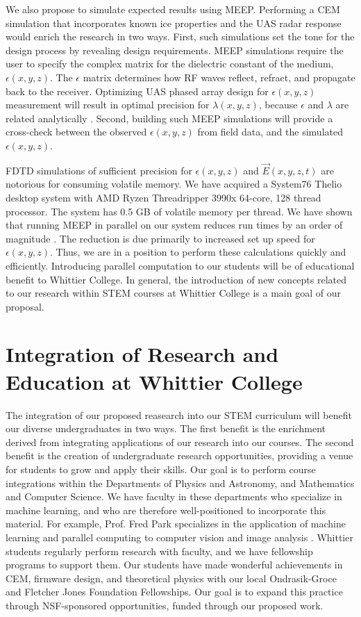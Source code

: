 \documentclass[11pt]{amsart}
\begin{document}
We also propose to simulate expected results using MEEP.  Performing a CEM simulation that incorporates known ice properties and the UAS radar response would enrich the research in two ways.  First, such simulations set the tone for the design process by revealing design requirements.  MEEP simulations require the user to specify the complex matrix for the dielectric constant of the medium, $\epsilon(x,y,z)$.  The $\epsilon$ matrix  determines how RF waves reflect, refract, and propagate back to the receiver.  Optimizing UAS phased array design for $\epsilon(x,y,z)$ measurement will result in optimal precision for $\lambda(x,y,z)$, because $\epsilon$ and $\lambda$ are related analytically \cite{10.3189/2015jog14j214}.  Second, building such MEEP simulations will provide a cross-check between the observed $\epsilon(x,y,z)$ from field data, and the simulated $\epsilon(x,y,z)$. 

FDTD simulations of sufficient precision for $\epsilon(x,y,z)$ and $\vec{E}(x,y,z,t)$ are notorious for consuming volatile memory.  We have acquired a System76 Thelio desktop system with AMD Ryzen Threadripper 3990x 64-core, 128 thread processor.  The system has 0.5 GB of volatile memory per thread.  We have shown that running MEEP in parallel on our system reduces run times by an order of magnitude \cite{meepcon2022}.  The reduction is due primarily to increased set up speed for $\epsilon(x,y,z)$.  Thus, we are in a position to perform these calculations quickly and efficiently.  Introducing parallel computation to our students will be of educational benefit to Whittier College.  In general, the introduction of new concepts related to our research within STEM courses at Whittier College is a main goal of our proposal.

\section{Integration of Research and Education at Whittier College}
\label{sec:int}

The integration of our proposed reasearch into our STEM curriculum will benefit our diverse undergraduates in two ways.  The first benefit is the enrichment derived from integrating applications of our research into our courses.  The second benefit is the creation of undergraduate research opportunities, providing a venue for students to grow and apply their skills.  Our goal is to perform course integrations within the Departments of Physics and Astronomy, and Mathematics and Computer Science.  We have faculty in these departments who specialize in machine learning, and who are therefore well-positioned to incorporate this material.  For example, Prof. Fred Park specializes in the application of machine learning and parallel computing to computer vision and image analysis \cite{SHI201528,doi:10.1137/20M1337041}.  Whittier students regularly perform research with faculty, and we have fellowship programs to support them.  Our students have made wonderful achievements in CEM, firmware design, and theoretical physics with our local Ondrasik-Groce and Fletcher Jones Foundation Fellowships.  Our goal is to expand this practice through NSF-sponsored opportunities, funded through our proposed work.
\end{document}

